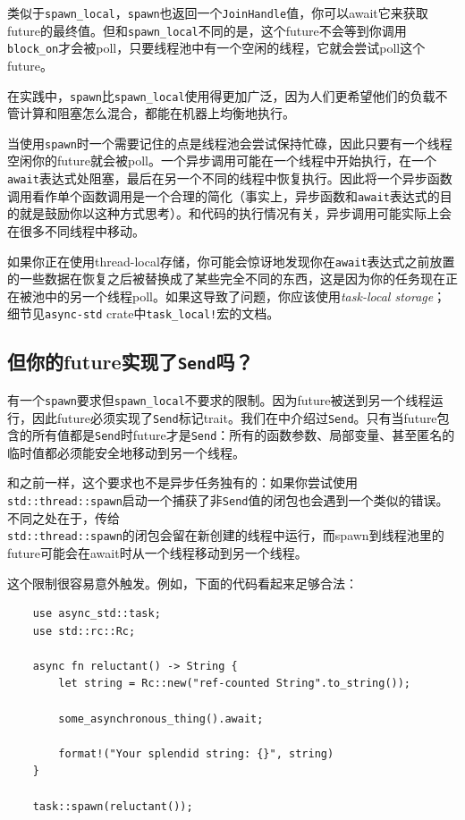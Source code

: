 类似于\texttt{spawn\_local}，\texttt{spawn}也返回一个\texttt{JoinHandle}值，你可以await它来获取future的最终值。但和\texttt{spawn\_local}不同的是，这个future不会等到你调用\texttt{block\_on}才会被poll，只要线程池中有一个空闲的线程，它就会尝试poll这个future。

在实践中，\texttt{spawn}比\texttt{spawn\_local}使用得更加广泛，因为人们更希望他们的负载不管计算和阻塞怎么混合，都能在机器上均衡地执行。

当使用\texttt{spawn}时一个需要记住的点是线程池会尝试保持忙碌，因此只要有一个线程空闲你的future就会被poll。一个异步调用可能在一个线程中开始执行，在一个\texttt{await}表达式处阻塞，最后在另一个不同的线程中恢复执行。因此将一个异步函数调用看作单个函数调用是一个合理的简化（事实上，异步函数和\texttt{await}表达式的目的就是鼓励你以这种方式思考）。和代码的执行情况有关，异步调用可能实际上会在很多不同线程中移动。

如果你正在使用thread-local存储，你可能会惊讶地发现你在\texttt{await}表达式之前放置的一些数据在恢复之后被替换成了某些完全不同的东西，这是因为你的任务现在正在被池中的另一个线程poll。如果这导致了问题，你应该使用\emph{task-local storage}；细节见\texttt{async-std} crate中\texttt{task\_local!}宏的文档。

\subsection{但你的future实现了\texttt{Send}吗？}
有一个\texttt{spawn}要求但\texttt{spawn\_local}不要求的限制。因为future被送到另一个线程运行，因此future必须实现了\texttt{Send}标记trait。我们在中介绍过\texttt{Send}。只有当future包含的所有值都是\texttt{Send}时future才是\texttt{Send}：所有的函数参数、局部变量、甚至匿名的临时值都必须能安全地移动到另一个线程。

和之前一样，这个要求也不是异步任务独有的：如果你尝试使用\texttt{std::thread::spawn}启动一个捕获了非\texttt{Send}值的闭包也会遇到一个类似的错误。不同之处在于，传给\\
\texttt{std::thread::spawn}的闭包会留在新创建的线程中运行，而spawn到线程池里的future可能会在await时从一个线程移动到另一个线程。

这个限制很容易意外触发。例如，下面的代码看起来足够合法：
\begin{verbatim}
    use async_std::task;
    use std::rc::Rc;

    async fn reluctant() -> String {
        let string = Rc::new("ref-counted String".to_string());

        some_asynchronous_thing().await;

        format!("Your splendid string: {}", string)
    }

    task::spawn(reluctant());
\end{verbatim}

